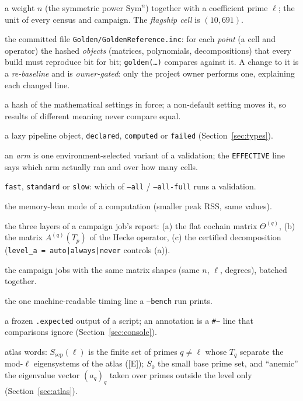 \documentclass[11pt,openany]{report}
\newcommand{\Sym}{\mathrm{Sym}}
\newcommand{\cli}[1]{\texttt{#1}}
\newcommand{\file}[1]{\nolinkurl{#1}}
\newcommand{\vb}[1]{\texttt{#1}}
\begin{document}
\begin{description}[style=nextline,font=\normalfont\bfseries,nosep]
\item[cell $(n,\ell)$] a weight $n$ (the symmetric power $\Sym^n$) together with a coefficient prime $\ell$; the unit of every census and campaign. The \emph{flagship cell} is $(10,691)$.
\item[golden reference / point / object] the committed file \file{Golden/GoldenReference.inc}: for each \emph{point} (a cell and operator) the hashed \emph{objects} (matrices, polynomials, decompositions) that every build must reproduce bit for bit; \vb{golden(\dots)} compares against it. A change to it is a \emph{re-baseline} and is \emph{owner-gated}: only the project owner performs one, explaining each changed line.
\item[fingerprint] a hash of the mathematical settings in force; a non-default setting moves it, so results of different meaning never compare equal.
\item[handle] a lazy pipeline object, \texttt{declared}, \texttt{computed} or \texttt{failed} (Section~\ref{sec:types}).
\item[arm, \texttt{EFFECTIVE} line] an \emph{arm} is one environment-selected variant of a validation; the \texttt{EFFECTIVE} line says which arm actually ran and over how many cells.
\item[tier] \texttt{fast}, \texttt{standard} or \texttt{slow}: which of \cli{--all} / \cli{--all-full} runs a validation.
\item[lean] the memory-lean mode of a computation (smaller peak RSS, same values).
\item[report levels (a)/(b)/(c)] the three layers of a campaign job's report: (a) the flat cochain matrix $\Theta^{(q)}$, (b) the matrix $A^{(q)}(T_p)$ of the Hecke operator, (c) the certified decomposition (\texttt{level\_a = auto|always|never} controls (a)).
\item[shape group] the campaign jobs with the same matrix shapes (same $n$, $\ell$, degrees), batched together.
\item[\texttt{BENCH} line] the one machine-readable timing line a \cli{--bench} run prints.
\item[transcript, annotation] a frozen \file{.expected} output of a script; an annotation is a \texttt{\#\textasciitilde{}} line that comparisons ignore (Section~\ref{sec:console}).
\item[$S_0$, $S_{\mathrm{sep}}(\ell)$, ``anemic''] atlas words: $S_{\mathrm{sep}}(\ell)$ is the finite set of primes $q\ne\ell$ whose $T_q$ separate the mod-$\ell$ eigensystems of the atlas ([E]); $S_0$ the small base prime set, and ``anemic'' the eigenvalue vector $(a_q)_q$ taken over primes outside the level only (Section~\ref{sec:atlas}).
\end{description}
\end{document}
